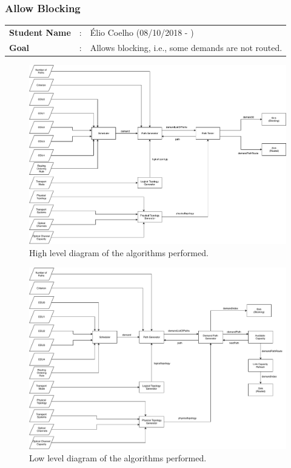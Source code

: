 \subsubsection{Allow Blocking}

\begin{tcolorbox}	
	\begin{tabular}{p{2.75cm} p{0.2cm} p{10.5cm}} 	
		\textbf{Student Name}   &:& \'Elio Coelho    (08/10/2018 - )\\
		\textbf{Goal}           &:& Allows blocking, i.e., some demands are not routed.
	\end{tabular}
\end{tcolorbox}

\vspace{13pt}

\begin{figure}[H]
	\centering
	\includegraphics[width=16cm]{sdf/heuristic/opaque_survivability/figures/fluxogramaTopLevel}
	\caption{High level diagram of the algorithms performed.}
	\label{fluxogram_opaque_surv}
\end{figure}

\begin{figure}[H]
	\centering
	\includegraphics[width=16cm]{sdf/heuristic/opaque_survivability/figures/fluxogramaLowLevel}
	\caption{Low level diagram of the algorithms performed.}
    \label{fluxogram_opaque_surv}
\end{figure}


